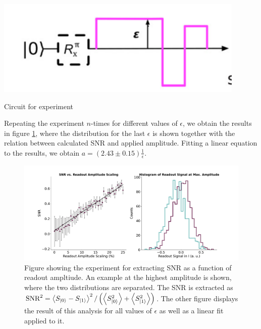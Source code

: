 \begin{marginfigure}
    \centering
    \includegraphics{Figs/calibrations/efficiency/experiment_circuit_SNR.png}
    \caption{Circuit for experiment}
    \label{fig:efficiency_SNR_experiment}
\end{marginfigure}

Repeating the experiment $n$-times for different values of $\epsilon$, we obtain the results in figure \ref{fig:effiiency_results_SNR}, where the distribution for the last $\epsilon$ is shown together with the relation between calculated SNR and applied amplitude. Fitting a linear equation to the results, we obtain $a = (2.43 \pm 0.15) \frac{1}{\epsilon}$.  

\begin{figure}
    \centering
    \includegraphics{Calibrations/Figures/SNR_vs_amplitude.pdf}
    \caption{Figure showing the experiment for extracting SNR as a function of readout ampltiude. An example at the highest amplitude is shown, where the two distributions are separated. The SNR is extracted as $\text{SNR}^2 = \expval{S_{\ket{0}} - S_{\ket{1}}}^2/\left(\expval{S^2_{\ket{0}}} +\expval{S^2_{\ket{1}}}\right)$. The other figure displays the result of this analysis for all values of $\epsilon$ as well as a linear fit applied to it.}
    \label{fig:effiiency_results_SNR}
\end{figure}



